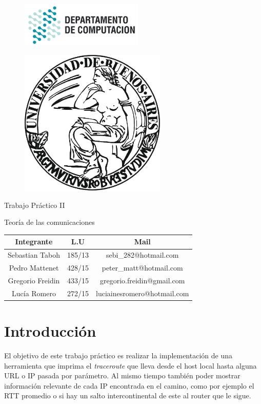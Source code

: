 \documentclass[a4paper,10pt]{article}
\begin{document}
\begin{figure}
    \includegraphics{imagenes/logodc.jpg}
\end{figure}
\begin{figure}[b]
    \includegraphics[height=7cm]{imagenes/logouba.jpg}
\end{figure}
\begin{center}
    \Huge {Trabajo Práctico II }

\end{center}
\begin{center}
\LARGE{Teoría de las comunicaciones}
\end{center}
\medskip
\medskip
\medskip
\medskip
\medskip
\medskip
\medskip
\medskip
\medskip
\medskip
\medskip
\medskip


\begin{center}
    \begin{tabular}{|c|c|c|}
        \hline
        Integrante & L.U  & Mail \\ \hline  
        Sebastian Taboh & 185/13 & sebi\_282@hotmail.com \\ \hline
        Pedro Mattenet & 428/15 & peter\_matt@hotmail.com \\ \hline
        Gregorio Freidin & 433/15 & gregorio.freidin@gmail.com \\ \hline
        Lucía Romero & 272/15 & luciainesromero@hotmail.com \\ \hline
    \end{tabular}
\end{center}

\newpage

\section{Introducción}
\par{El objetivo de este trabajo práctico es realizar la implementación de una herramienta que imprima el \textit{traceroute} que lleva desde el host local hasta alguna URL o IP pasada por parámetro. Al mismo tiempo también poder mostrar información relevante de cada IP encontrada en el camino, como por ejemplo el RTT promedio o si hay un salto intercontinental de este al router que le sigue.}
\medskip
\medskip
\end{document}
